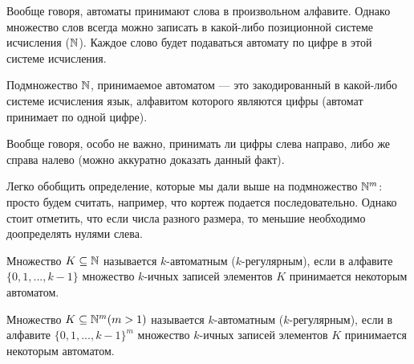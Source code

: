     
    
    \begin{Rem}
        Вообще говоря, автоматы принимают слова в произвольном алфавите. Однако множество слов всегда можно записать в какой-либо позиционной системе исчисления ($\N$). Каждое слово будет подаваться автомату по цифре в этой системе исчисления.  
    \end{Rem}
    \begin{Def}[Подмножество $\N$]
        Подмножество $\N$, принимаемое автоматом --- это закодированный в какой-либо системе исчисления язык, алфавитом которого являются цифры (автомат принимает по одной цифре). 
    \end{Def}
    \begin{Rem}
        Вообще говоря, особо не важно, принимать ли цифры слева направо, либо же справа налево (можно аккуратно доказать данный факт).
    \end{Rem}
    \begin{Rem}
        Легко обобщить определение, которые мы дали выше на подмножество $\mathbb{N}^m$: просто будем считать, например, что кортеж подается последовательно. Однако стоит отметить, что если числа разного размера, то меньшие необходимо доопределять нулями слева.
    \end{Rem}
    \begin{Def}
        Множество $K \subseteq \mathbb{N}$ называется $k$-автоматным ($k$-регулярным), если в алфавите $\{0, 1, ..., k - 1\}$ множество $k$-ичных записей элементов $K$ принимается некоторым автоматом.
    \end{Def}
        \begin{Def}
        Множество $K \subseteq \mathbb{N}^m (m > 1)$ называется $k$-автоматным ($k$-регулярным), если в алфавите $\{0, 1, ..., k - 1\}^m$ множество $k$-ичных записей элементов $K$ принимается некоторым автоматом.
    \end{Def}


